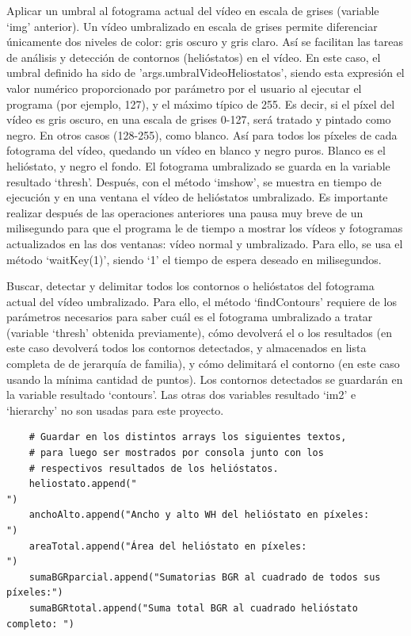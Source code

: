 Aplicar un umbral al fotograma actual del vídeo en escala de grises (variable ‘img’ anterior). Un vídeo umbralizado en escala de grises permite diferenciar únicamente dos niveles de color: gris oscuro y gris claro. Así se facilitan las tareas de análisis y detección de contornos (helióstatos) en el vídeo. En este caso, el umbral definido ha sido de 'args.umbralVideoHeliostatos', siendo esta expresión el valor numérico proporcionado por parámetro por el usuario al ejecutar el programa (por ejemplo, 127), y el máximo típico de 255. Es decir, si el píxel del vídeo es gris oscuro, en una escala de grises 0-127, será tratado y pintado como negro. En otros casos (128-255), como blanco. Así para todos los píxeles de cada fotograma del vídeo, quedando un vídeo en blanco y negro puros. Blanco es el helióstato, y negro el fondo. El fotograma umbralizado se guarda en la variable resultado ‘thresh’. Después, con el método ‘imshow’, se muestra en tiempo de ejecución y en una ventana el vídeo de helióstatos umbralizado. Es importante realizar después de las operaciones anteriores una pausa muy breve de un milisegundo para que el programa le de tiempo a mostrar los vídeos y fotogramas actualizados en las dos ventanas: vídeo normal y umbralizado. Para ello, se usa el método ‘waitKey(1)’, siendo ‘1’ el tiempo de espera deseado en milisegundos.

Buscar, detectar y delimitar todos los contornos o helióstatos del fotograma actual del vídeo umbralizado. Para ello, el método ‘findContours’ requiere de los parámetros necesarios para saber cuál es el fotograma umbralizado a tratar (variable ‘thresh’ obtenida previamente), cómo devolverá el o los resultados (en este caso devolverá todos los contornos detectados, y almacenados en lista completa de de jerarquía de familia), y cómo delimitará el contorno (en este caso usando la mínima cantidad de puntos). Los contornos detectados se guardarán en la variable resultado ‘contours’. Las otras dos variables resultado ‘im2’ e ‘hierarchy’ no son usadas para este proyecto.\\[20pt]

\begin{lstlisting}
	# Guardar en los distintos arrays los siguientes textos,
	# para luego ser mostrados por consola junto con los
	# respectivos resultados de los helióstatos.
    heliostato.append("                                               ")
    anchoAlto.append("Ancho y alto WH del helióstato en píxeles:      ")
    areaTotal.append("Área del helióstato en píxeles:                 ")
    sumaBGRparcial.append("Sumatorias BGR al cuadrado de todos sus píxeles:")
    sumaBGRtotal.append("Suma total BGR al cuadrado helióstato completo: ")
\end{lstlisting}
    

